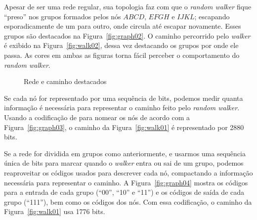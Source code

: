 \documentclass[
  article,
  11pt,
  a4paper,
  english,
  brazil,
  sumario=tradicional]{abntex2}
\begin{document}
Apesar de ser uma rede regular, sua topologia faz com que o \textit{random walker} fique \enquote{preso} nos grupos formados pelos nós $ABCD$, $EFGH$ e $IJKL$; escapando esporadicamente de um para outro, onde circula até escapar novamente. Esses grupos são destacados na Figura~\ref{fig:graph02}. O caminho percorrido pelo \textit{walker} é exibido na Figura~\ref{fig:walk02}, dessa vez destacando os grupos por onde ele passa. As cores em ambas as figuras torna fácil perceber o comportamento do \textit{random walker}.

\begin{figure}[ht]
  \centering
  \caption{Rede e caminho destacados}
\end{figure}

Se cada nó for representado por uma sequência de bits, podemos medir quanta informação é necessária para representar o caminho feito pelo \textit{random walker}. Usando a codificação de  para nomear os nós de acordo com a Figura~\ref{fig:graph03}, o caminho da Figura~\ref{fig:walk01} é representado por 2880 bits.

Se a rede for dividida em grupos como anteriormente, e usarmos uma sequência única de bits para marcar quando o \textit{walker} entra ou sai de um grupo, podemos reaproveitar os códigos usados para descrever cada nó, compactando a informação necessária para representar o caminho. A Figura~\ref{fig:graph04} mostra os códigos para a entrada de cada grupo (\enquote{00}, \enquote{10} e \enquote{11}) e os códigos de saída de cada grupo (\enquote{111}), bem como os códigos dos nós. Com essa codificação, o caminho da Figura~\ref{fig:walk01} usa 1776 bits.
\end{document}
